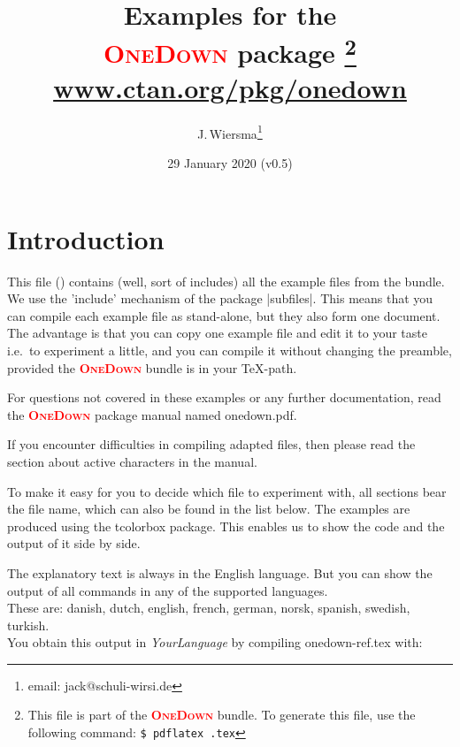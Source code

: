 \documentclass[a4paper,fontsize=11pt,%
  danish,%
  dutch,%
  french,%
  german,%
  norsk,%
  spanish,%
  swedish,%
  turkish,%
  english,%
]{scrartcl}
\newcommand\OneDown{\textcolor{red}{\smaller\bfseries\textsc{OneDown}}\xspace}
\def\ExLang{english}
\begin{document}
%
\expandafter\selectlanguage\expandafter{\ExLang}
\title{Examples for the\\\OneDown package%
\footnote{This file is part of the \OneDown bundle. To generate this file,
use the following command: \newline \texttt{\$ pdflatex \jobname.tex}}
\\[1em]
\normalsize\url{www.ctan.org/pkg/onedown}
}
\author{J.\,Wiersma\footnote{email: \textsf{jack@schuli-wirsi.de}}}
\date{29 January 2020 (v0.5)}
\maketitle

\section*{Introduction}
This file (\jobname) contains (well, sort of includes) all the example
files from the bundle. We use the 'include' mechanism of the package
|subfiles|. This means that you can compile each example file as
stand-alone, but they also form one document.
The advantage is that you can copy one example file and edit it to your
taste i.e.\ to experiment a little, and you can compile it without changing
the preamble, provided the \OneDown bundle is in your \TeX-path.

For questions not covered in these examples or any further documentation,
read the \OneDown package manual named onedown.pdf.

If you encounter difficulties in compiling adapted files, then please read
the section about active characters in the manual.

To make it easy for you to decide which file to experiment with, all
sections bear the file name, which can also be found in the list below. The
examples are produced using the \textsf{tcolorbox} package. This enables us
to show the code and the output of it side by side.

The explanatory text is always in the English language. But you can show the
output of all commands in any of the supported languages.\\
These are: danish, dutch, english, french, german, norsk, spanish, swedish, turkish. \\
You obtain this output in \emph{YourLanguage} by compiling onedown-ref.tex with: \\[0.2em]
\end{document}
